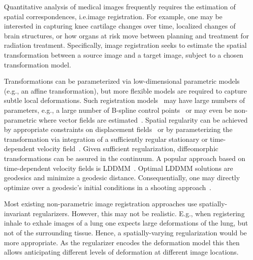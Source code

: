 \documentclass{article}
\numberwithin{equation}{section}
\newcommand{\ie}{{i.e.}}
\newcommand{\eg}{{e.g.}}
\newcommand{\Eg}{{E.g.}}
\begin{document}
Quantitative analysis of medical images frequently requires the estimation of spatial correspondences, \ie image registration. For example, one may be interested in capturing knee cartilage changes over time, localized changes of brain structures, or how organs at risk move between planning and treatment for radiation treatment. Specifically, image registration seeks to estimate the spatial transformation between a source image and a target image, subject to a chosen transformation model. 





Transformations can be parameterized via low-dimensional parametric models (\eg, an affine transformation), but more flexible models are required to capture subtle local deformations. Such registration models~\cite{bajcsy1989multiresolution,shen2002hammer} may have large numbers of parameters, \eg, a large number of B-spline control points~\cite{rueckert1999nonrigid} or may even be non-parametric where vector fields are estimated~\cite{beg2005computing,modersitzki2004numerical}. Spatial regularity can be achieved by appropriate constraints on displacement fields~\cite{haber2007image} or by parameterizing the transformation via integration of a sufficiently regular stationary or time-dependent velocity field~\cite{beg2005computing,hart2009optimal,vercauteren2009diffeomorphic,chen2013large,wulff2015efficient}. Given sufficient regularization, diffeomorphic transformations can be assured in the continuum. A popular approach based on time-dependent velocity fields is LDDMM~\cite{beg2005computing,hart2009optimal}. Optimal LDDMM solutions are geodesics and minimize a geodesic distance. Consequentially, one may directly optimize over a geodesic's initial conditions in a shooting approach~\cite{vialard2012diffeomorphic}.

Most existing non-parametric image registration approaches use spatially-invariant regularizers. However, this may not be realistic. \Eg, when registering inhale to exhale images of a lung one expects large deformations of the lung, but not of the surrounding tissue. Hence, a spatially-varying regularization would be more appropriate. As the regularizer encodes the deformation model this then allows anticipating different levels of deformation at different image locations.
\end{document}
